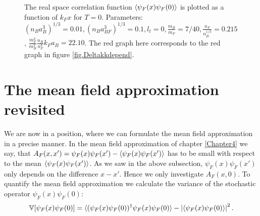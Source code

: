 \begin{figure} 
\begin{center}  
  
\caption{The real space correlation function $\braket{\psi_F(x)\psi_F(0)}$ is plotted as a function of $k_Fx$ for $T = 0$. Parameters: $(n_Ba_B^3)^{1/3} = 0.01, (n_Ba_{BF}^3)^{1/3} = 0.1, l_t = 0, \frac{m_B}{m_F} = 7/40, \frac{n_F}{n_B^{1/3}} = 0.215$, $\frac{m_F^2}{m_B^2}\frac{n_B}{n_F^3} k_Fa_B = 22.10$. The red graph here corresponds to the red graph in figure \ref{fig.Deltakkdepend}.}  
\label{fig.pairwavefunction}  
\end{center}    
\end{figure}

\section{The mean field approximation revisited}
We are now in a position, where we can formulate the mean field approximation in a precise manner. In the mean field approximation of chapter \ref{Chapter4} we say, that $A_F(x,x') = \psi_F(x)\psi_F(x') - \braket{\psi_F(x)\psi_F(x')}$ has to be small with respect to the mean $\braket{\psi_F(x)\psi_F(x')}$. As we saw in the above subsection, $\psi_F(x)\psi_F(x')$ only depends on the difference $x-x'$. Hence we only investigate $A_F(x,0)$. 
To quantify the mean field approximation we calculate the variance of the stochastic operator $\psi_F(x)\psi_F(0)$:
\begin{equation}
\mathbb{V}[\psi_F(x)\psi_F(0)] = \braket{(\psi_F(x)\psi_F(0))^\dagger \psi_F(x)\psi_F(0)} - \left|\braket{\psi_F(x)\psi_F(0)}\right|^2. \nonumber  
\end{equation}

